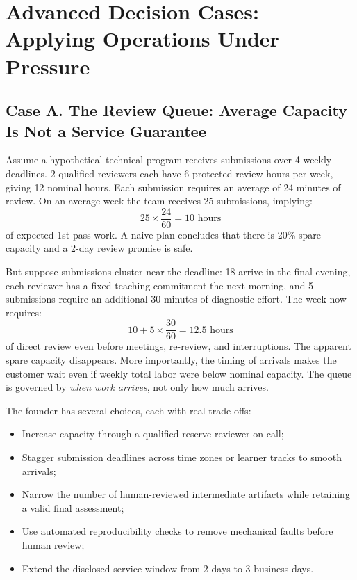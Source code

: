 \section*{Advanced Decision Cases: Applying Operations Under Pressure}

\subsection*{Case A. The Review Queue: Average Capacity Is Not a Service Guarantee}

Assume a hypothetical technical program receives submissions over 4 weekly deadlines. 2 qualified reviewers each have 6 protected review hours per week, giving 12 nominal hours. Each submission requires an average of 24 minutes of review. On an average week the team receives 25 submissions, implying:
\begin{equation}
25 \times \frac{24}{60} = 10\text{ hours}
\end{equation}
of expected 1st-pass work. A naive plan concludes that there is 20\% spare capacity and a 2-day review promise is safe.

But suppose submissions cluster near the deadline: 18 arrive in the final evening, each reviewer has a fixed teaching commitment the next morning, and 5 submissions require an additional 30 minutes of diagnostic effort. The week now requires:
\begin{equation}
10 + 5 \times \frac{30}{60} = 12.5\text{ hours}
\end{equation}
of direct review even before meetings, re-review, and interruptions. The apparent spare capacity disappears. More importantly, the timing of arrivals makes the customer wait even if weekly total labor were below nominal capacity. The queue is governed by \textit{when work arrives}, not only how much arrives.

The founder has several choices, each with real trade-offs:
\begin{itemize}
    \item Increase capacity through a qualified reserve reviewer on call;
    \item Stagger submission deadlines across time zones or learner tracks to smooth arrivals;
    \item Narrow the number of human-reviewed intermediate artifacts while retaining a valid final assessment;
    \item Use automated reproducibility checks to remove mechanical faults before human review;
    \item Extend the disclosed service window from 2 days to 3 business days.
\end{itemize}

